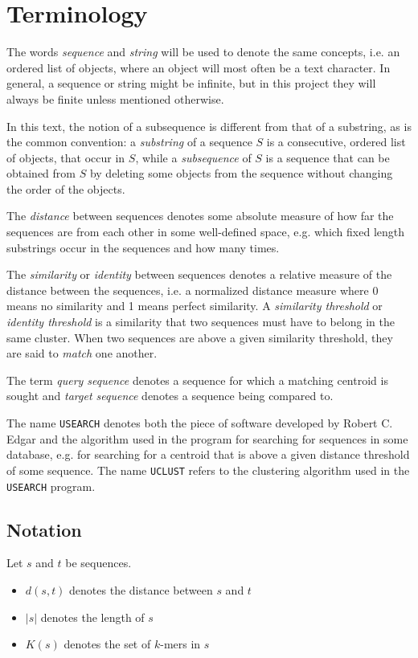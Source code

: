 \section{Terminology}

The words \emph{sequence} and \emph{string} will be used to denote the same
concepts, i.e. an ordered list of objects, where an object will most often be a
text character. In general, a sequence or string might be infinite, but in this
project they will always be finite unless mentioned otherwise.

In this text, the notion of a subsequence is different from that of a
substring, as is the common convention: a \emph{substring} of a sequence $S$ is
a consecutive, ordered list of objects, that occur in $S$, while a
\emph{subsequence} of $S$ is a sequence that can be obtained from $S$ by
deleting some objects from the sequence without changing the order of the
objects.

The \emph{distance} between sequences denotes some absolute measure of how far
the sequences are from each other in some well-defined space, e.g. which fixed
length substrings occur in the sequences and how many times.

The \emph{similarity} or \emph{identity} between sequences denotes a relative
measure of the distance between the sequences, i.e. a normalized distance
measure where 0 means no similarity and 1 means perfect similarity. A
\emph{similarity threshold} or \emph{identity threshold} is a similarity that
two sequences must have to belong in the same cluster.  When two sequences are
above a given similarity threshold, they are said to \emph{match} one another.

The term \emph{query sequence} denotes a sequence for which a matching centroid
is sought and \emph{target sequence} denotes a sequence being compared to.

The name \texttt{USEARCH} denotes both the piece of software developed by
Robert C. Edgar and the algorithm used in the program for searching for
sequences in some database, e.g. for searching for a centroid that is above a
given distance threshold of some sequence. The name \texttt{UCLUST} refers to
the clustering algorithm used in the \texttt{USEARCH} program.


\subsection{Notation}

Let $s$ and $t$ be sequences.
\begin{itemize}
  \item $d(s,t)$ denotes the distance between $s$ and $t$
  \item $|s|$ denotes the length of $s$
  \item $K(s)$ denotes the set of $k$-mers in $s$
\end{itemize}
